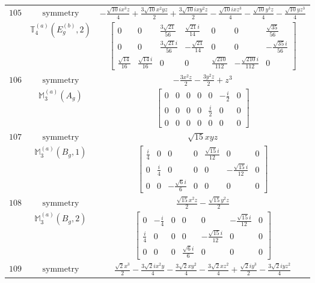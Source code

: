 \documentclass[fleqn,8pt,landscape]{jsarticle}
\begin{document}
\begin{longtable}{ccc}
$ 105 $ & $ \text{symmetry} $ & $ - \frac{\sqrt{10} i x^{3} z}{4} + \frac{3 \sqrt{10} x^{2} y z}{2} + \frac{3 \sqrt{10} i x y^{2} z}{2} - \frac{\sqrt{10} i x z^{3}}{4} - \frac{\sqrt{10} y^{3} z}{4} - \frac{\sqrt{10} y z^{3}}{4} $ \\
$  $ & $ \mathbb{T}_{4}^{(a)}(E_{g}^{(b)},2) $ & $ \begin{bmatrix} 0 & 0 & \frac{3 \sqrt{21}}{56} & \frac{\sqrt{21} i}{14} & 0 & 0 & \frac{\sqrt{35}}{56} \\ 0 & 0 & \frac{3 \sqrt{21} i}{56} & - \frac{\sqrt{21}}{14} & 0 & 0 & - \frac{\sqrt{35} i}{56} \\ \frac{\sqrt{14}}{16} & \frac{\sqrt{14} i}{16} & 0 & 0 & \frac{\sqrt{210}}{112} & - \frac{\sqrt{210} i}{112} & 0 \end{bmatrix} $ \\ \hline
$ 106 $ & $ \text{symmetry} $ & $ - \frac{3 x^{2} z}{2} - \frac{3 y^{2} z}{2} + z^{3} $ \\
$  $ & $ \mathbb{M}_{3}^{(a)}(A_{g}) $ & $ \begin{bmatrix} 0 & 0 & 0 & 0 & 0 & - \frac{i}{2} & 0 \\ 0 & 0 & 0 & 0 & \frac{i}{2} & 0 & 0 \\ 0 & 0 & 0 & 0 & 0 & 0 & 0 \end{bmatrix} $ \\ \hline
$ 107 $ & $ \text{symmetry} $ & $ \sqrt{15} x y z $ \\
$  $ & $ \mathbb{M}_{3}^{(a)}(B_{g},1) $ & $ \begin{bmatrix} \frac{i}{4} & 0 & 0 & 0 & \frac{\sqrt{15} i}{12} & 0 & 0 \\ 0 & \frac{i}{4} & 0 & 0 & 0 & - \frac{\sqrt{15} i}{12} & 0 \\ 0 & 0 & - \frac{\sqrt{6} i}{6} & 0 & 0 & 0 & 0 \end{bmatrix} $ \\ \hline
$ 108 $ & $ \text{symmetry} $ & $ \frac{\sqrt{15} x^{2} z}{2} - \frac{\sqrt{15} y^{2} z}{2} $ \\
$  $ & $ \mathbb{M}_{3}^{(a)}(B_{g},2) $ & $ \begin{bmatrix} 0 & - \frac{i}{4} & 0 & 0 & 0 & - \frac{\sqrt{15} i}{12} & 0 \\ \frac{i}{4} & 0 & 0 & 0 & - \frac{\sqrt{15} i}{12} & 0 & 0 \\ 0 & 0 & 0 & \frac{\sqrt{6} i}{6} & 0 & 0 & 0 \end{bmatrix} $ \\ \hline
$ 109 $ & $ \text{symmetry} $ & $ \frac{\sqrt{2} x^{3}}{2} - \frac{3 \sqrt{2} i x^{2} y}{4} - \frac{3 \sqrt{2} x y^{2}}{4} - \frac{3 \sqrt{2} x z^{2}}{4} + \frac{\sqrt{2} i y^{3}}{2} - \frac{3 \sqrt{2} i y z^{2}}{4} $ \\

\end{longtable}
\end{document}
